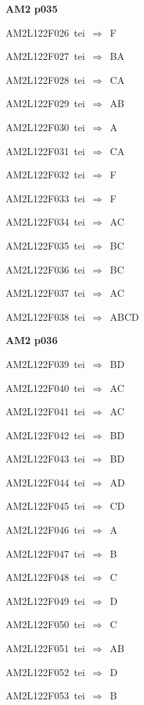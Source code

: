 \par\vfill\eject
{\bf\hfill AM2 p035\hfill\hbox{}}\par\bigskip
{\sixrm AM2L122F026\ {\sixit tei}\ }$\Rightarrow$\ F\par\smallskip
{\sixrm AM2L122F027\ {\sixit tei}\ }$\Rightarrow$\ BA\par\smallskip
{\sixrm AM2L122F028\ {\sixit tei}\ }$\Rightarrow$\ CA\par\smallskip
{\sixrm AM2L122F029\ {\sixit tei}\ }$\Rightarrow$\ AB\par\smallskip
{\sixrm AM2L122F030\ {\sixit tei}\ }$\Rightarrow$\ A\par\smallskip
{\sixrm AM2L122F031\ {\sixit tei}\ }$\Rightarrow$\ CA\par\smallskip
{\sixrm AM2L122F032\ {\sixit tei}\ }$\Rightarrow$\ F\par\smallskip
{\sixrm AM2L122F033\ {\sixit tei}\ }$\Rightarrow$\ F\par\smallskip
{\sixrm AM2L122F034\ {\sixit tei}\ }$\Rightarrow$\ AC\par\smallskip
{\sixrm AM2L122F035\ {\sixit tei}\ }$\Rightarrow$\ BC\par\smallskip
{\sixrm AM2L122F036\ {\sixit tei}\ }$\Rightarrow$\ BC\par\smallskip
{\sixrm AM2L122F037\ {\sixit tei}\ }$\Rightarrow$\ AC\par\smallskip
{\sixrm AM2L122F038\ {\sixit tei}\ }$\Rightarrow$\ ABCD\par\smallskip

\par\vfill\eject
{\bf\hfill AM2 p036\hfill\hbox{}}\par\bigskip
{\sixrm AM2L122F039\ {\sixit tei}\ }$\Rightarrow$\ BD\par\smallskip
{\sixrm AM2L122F040\ {\sixit tei}\ }$\Rightarrow$\ AC\par\smallskip
{\sixrm AM2L122F041\ {\sixit tei}\ }$\Rightarrow$\ AC\par\smallskip
{\sixrm AM2L122F042\ {\sixit tei}\ }$\Rightarrow$\ BD\par\smallskip
{\sixrm AM2L122F043\ {\sixit tei}\ }$\Rightarrow$\ BD\par\smallskip
{\sixrm AM2L122F044\ {\sixit tei}\ }$\Rightarrow$\ AD\par\smallskip
{\sixrm AM2L122F045\ {\sixit tei}\ }$\Rightarrow$\ CD\par\smallskip
{\sixrm AM2L122F046\ {\sixit tei}\ }$\Rightarrow$\ A\par\smallskip
{\sixrm AM2L122F047\ {\sixit tei}\ }$\Rightarrow$\ B\par\smallskip
{\sixrm AM2L122F048\ {\sixit tei}\ }$\Rightarrow$\ C\par\smallskip
{\sixrm AM2L122F049\ {\sixit tei}\ }$\Rightarrow$\ D\par\smallskip
{\sixrm AM2L122F050\ {\sixit tei}\ }$\Rightarrow$\ C\par\smallskip
{\sixrm AM2L122F051\ {\sixit tei}\ }$\Rightarrow$\ AB\par\smallskip
{\sixrm AM2L122F052\ {\sixit tei}\ }$\Rightarrow$\ D\par\smallskip
{\sixrm AM2L122F053\ {\sixit tei}\ }$\Rightarrow$\ B\par\smallskip

